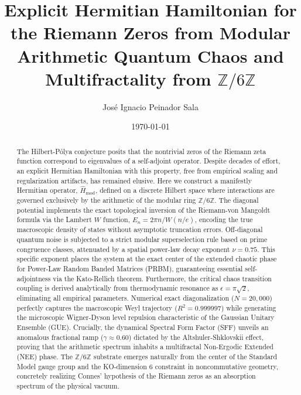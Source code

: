 \documentclass[aps,prl,preprint,superscriptaddress,floatfix]{revtex4-2}
\newcommand{\Zmod}{\mathbb{Z}/6\mathbb{Z}}
\begin{document}
\title{Explicit Hermitian Hamiltonian for the Riemann Zeros from Modular Arithmetic Quantum Chaos and Multifractality from \texorpdfstring{$\Zmod$}{Z/6Z}}

\author{José Ignacio Peinador Sala }

\date{\today}

\begin{abstract}
The Hilbert-P\'olya conjecture posits that the nontrivial zeros of the Riemann zeta function correspond to eigenvalues of a self-adjoint operator. Despite decades of effort, an explicit Hermitian Hamiltonian with this property, free from empirical scaling and regularization artifacts, has remained elusive. Here we construct a manifestly Hermitian operator, $\hat{H}_{\text{mod}}$, defined on a discrete Hilbert space where interactions are governed exclusively by the arithmetic of the modular ring $\mathbb{Z}/6\mathbb{Z}$. The diagonal potential implements the exact topological inversion of the Riemann-von Mangoldt formula via the Lambert $W$ function, $E_n = 2\pi n / W(n/e)$, encoding the true macroscopic density of states without asymptotic truncation errors. Off-diagonal quantum noise is subjected to a strict modular superselection rule based on prime congruence classes, attenuated by a spatial power-law decay exponent $\nu = 0.75$. This specific exponent places the system at the exact center of the extended chaotic phase for Power-Law Random Banded Matrices (PRBM), guaranteeing essential self-adjointness via the Kato-Rellich theorem. Furthermore, the critical chaos transition coupling is derived analytically from thermodynamic resonance as $\epsilon = \pi \sqrt{2}$, eliminating all empirical parameters. Numerical exact diagonalization ($N=20,000$) perfectly captures the macroscopic Weyl trajectory ($R^2 = 0.999997$) while generating the microscopic Wigner-Dyson level repulsion characteristic of the Gaussian Unitary Ensemble (GUE). Crucially, the dynamical Spectral Form Factor (SFF) unveils an anomalous fractional ramp ($\gamma \approx 0.60$) dictated by the Altshuler-Shklovskii effect, proving that the arithmetic spectrum inhabits a multifractal Non-Ergodic Extended (NEE) phase. The $\Zmod$ substrate emerges naturally from the center of the Standard Model gauge group and the KO-dimension 6 constraint in noncommutative geometry, concretely realizing Connes' hypothesis of the Riemann zeros as an absorption spectrum of the physical vacuum.
\end{abstract}
\end{document}
